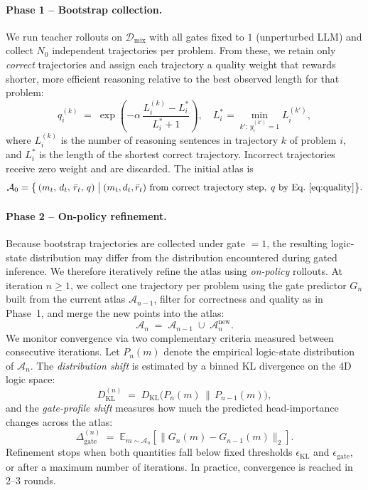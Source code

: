 \documentclass{article}
\newcommand{\E}{\mathbb{E}}
\begin{document}
\paragraph{Phase 1 -- Bootstrap collection.}
We run teacher rollouts on $\mathcal{D}_{\mathrm{mix}}$ with all gates fixed to $1$ (unperturbed LLM) and collect $N_0$ independent trajectories per problem. From these, we retain only \emph{correct} trajectories and assign each trajectory a quality weight that rewards shorter, more efficient reasoning relative to the best observed length for that problem:
\begin{equation}
q^{(k)}_i \;=\; \exp\!\left(-\alpha\,\frac{L^{(k)}_i - L^*_i}{L^*_i + 1}\right),
\quad L^*_i = \min_{k':\,y^{(k')}_i=1} L^{(k')}_i,
\label{eq:quality}
\end{equation}
where $L^{(k)}_i$ is the number of reasoning sentences in trajectory $k$ of problem $i$, and $L^*_i$ is the length of the shortest correct trajectory. Incorrect trajectories receive zero weight and are discarded. The initial atlas is
\[
\mathcal{A}_0 = \bigl\{\,(m_t,\,d_t,\,\bar r_t,\,q)\;\big|\;(m_t,d_t,\bar r_t)\text{ from correct trajectory step},\;q\text{ by Eq.~}\eqref{eq:quality}\bigr\}.
\]

\paragraph{Phase 2 -- On-policy refinement.}
Because bootstrap trajectories are collected under gate $=1$, the resulting logic-state distribution may differ from the distribution encountered during gated inference. We therefore iteratively refine the atlas using \emph{on-policy} rollouts. At iteration $n\ge 1$, we collect one trajectory per problem using the gate predictor $G_n$ built from the current atlas $\mathcal{A}_{n-1}$, filter for correctness and quality as in Phase~1, and merge the new points into the atlas:
\[
\mathcal{A}_n \;=\; \mathcal{A}_{n-1} \;\cup\; \mathcal{A}^{\mathrm{new}}_n.
\]
We monitor convergence via two complementary criteria measured between consecutive iterations. Let $P_n(m)$ denote the empirical logic-state distribution of $\mathcal{A}_n$. The \emph{distribution shift} is estimated by a binned KL divergence on the 4D logic space:
\begin{equation}
D^{(n)}_{\mathrm{KL}} \;=\; D_{\mathrm{KL}}\!\bigl(P_n(m)\,\|\,P_{n-1}(m)\bigr),
\label{eq:kl_conv}
\end{equation}
and the \emph{gate-profile shift} measures how much the predicted head-importance changes across the atlas:
\begin{equation}
\Delta^{(n)}_{\mathrm{gate}} \;=\; \E_{m\sim\mathcal{A}_n}\!\left[\bigl\|G_n(m) - G_{n-1}(m)\bigr\|_2\right].
\label{eq:gate_conv}
\end{equation}
Refinement stops when both quantities fall below fixed thresholds $\epsilon_{\mathrm{KL}}$ and $\epsilon_{\mathrm{gate}}$, or after a maximum number of iterations. In practice, convergence is reached in 2--3 rounds.
\end{document}
